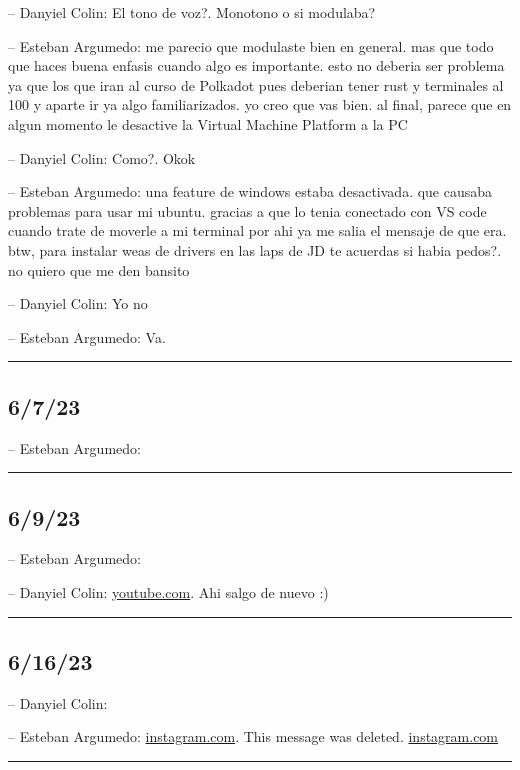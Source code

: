 -- Danyiel Colin: El tono de voz?. Monotono o si modulaba?

-- Esteban Argumedo: me parecio que modulaste bien en general. mas que
todo que haces buena enfasis cuando algo es importante. esto no deberia
ser problema ya que los que iran al curso de Polkadot pues deberian
tener rust y terminales al 100 y aparte ir ya algo familiarizados. yo
creo que vas bien. al final, parece que en algun momento le desactive la
Virtual Machine Platform a la PC

-- Danyiel Colin: Como?. Okok

-- Esteban Argumedo: una feature de windows estaba desactivada. que
causaba problemas para usar mi ubuntu. gracias a que lo tenia conectado
con VS code cuando trate de moverle a mi terminal por ahi ya me salia el
mensaje de que era. btw, para instalar weas de drivers en las laps de JD
te acuerdas si habia pedos?. no quiero que me den bansito

-- Danyiel Colin: Yo no

-- Esteban Argumedo: Va.

\begin{center}\rule{0.5\linewidth}{0.5pt}\end{center}

\hypertarget{section-211}{%
\subsection{6/7/23}\label{section-211}}

-- Esteban Argumedo:

\begin{center}\rule{0.5\linewidth}{0.5pt}\end{center}

\hypertarget{section-212}{%
\subsection{6/9/23}\label{section-212}}

-- Esteban Argumedo:

-- Danyiel Colin:
\href{https://www.youtube.com/live/pr6FUja-3Yk?feature=share\&t=2h06m}{youtube.com}.
Ahi salgo de nuevo :)

\begin{center}\rule{0.5\linewidth}{0.5pt}\end{center}

\hypertarget{section-213}{%
\subsection{6/16/23}\label{section-213}}

-- Danyiel Colin:

-- Esteban Argumedo:
\href{https://www.instagram.com/reel/Cs6pECQAMXL/?igshid=MzRlODBiNWFlZA==}{instagram.com}.
This message was deleted.
\href{https://www.instagram.com/reel/CtPA_YoO5r6/?igshid=MzRlODBiNWFlZA==}{instagram.com}

\begin{center}\rule{0.5\linewidth}{0.5pt}\end{center}
